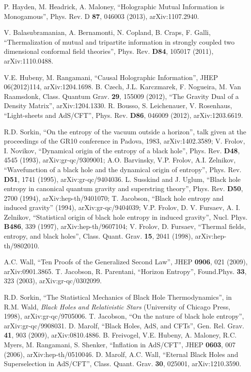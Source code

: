 \documentclass[12pt]{article}
\begin{document}
\begin{thebibliography}{99}
P. Hayden, M. Headrick, A. Maloney, ``Holographic Mutual Information is Monogamous'', Phys. Rev. D \textbf{87}, 046003 (2013), arXiv:1107.2940.

V. Balasubramanian, A. Bernamonti, N. Copland, B. Craps, F. Galli, ``Thermalization of mutual and tripartite information in strongly coupled two dimensional conformal field theories'', Phys. Rev. \textbf{D84}, 105017 (2011), arXiv:1110.0488.

V.E. Hubeny, M. Rangamani, ``Causal Holographic Information'', JHEP 06(2012)114, arXiv:1204.1698.
B. Czech, J.L. Karczmarek, F. Nogueira, M. Van Raamsdonk, Class. Quantum Grav. \textbf{29}, 155009 (2012), ``The Gravity Dual of a Density Matrix'', arXiv:1204.1330.
R. Bousso, S. Leichenauer, V. Rosenhaus, ``Light-sheets and AdS/CFT'', Phys. Rev. \textbf{D86}, 046009 (2012),  arXiv:1203.6619.

R.D. Sorkin, ``On the entropy of the vacuum outside a horizon'', talk given 
at the proceedings of the GR10 conference in Padova, 1983, arXiv:1402.3589;
V. Frolov, I. Novikov, ``Dynamical origin of the entropy of a black hole'', Phys. Rev. \textbf{D48}, 4545 (1993), 
arXiv:gr-qc/9309001; 
A.O. Barvinsky, V.P. Frolov, A.I. Zelnikov, ``Wavefunction of a black hole and the dynamical origin of entropy'', Phys. Rev. \textbf{D51}, 1741 (1995), arXiv:gr-qc/9404036.
L. Susskind and J. Uglum, ``Black hole entropy in canonical quantum gravity and superstring theory'', Phys. Rev. \textbf{D50}, 2700 (1994), arXiv:hep-th/9401070; 
T. Jacobson, ``Black hole entropy and induced gravity'' (1994), arXiv:gr-qc/9404039; 
V.P. Frolov, D. V. Fursaev, A. I. Zelnikov, ``Statistical origin of black hole entropy in induced gravity'', 
Nucl. Phys. \textbf{B486}, 339 (1997), arXiv:hep-th/9607104; 
V. Frolov, D. Fursaev, ``Thermal fields, entropy, and black holes'', Class. Quant. Grav. \textbf{15}, 2041 (1998), arXiv:hep-th/9802010.

A.C. Wall, ``Ten Proofs of the Generalized Second Law'', JHEP \textbf{0906}, 021 (2009), arXiv:0901.3865.
T. Jacobson, R. Parentani, ``Horizon Entropy'', Found.Phys. \textbf{33}, 323 (2003), arXiv:gr-qc/0302099.

R.D. Sorkin, ``The Statistical Mechanics of Black Hole Thermodynamics'', in R.M. Wald, \textit{Black Holes and Relativistic Stars} (University of Chicago Press, 1998), arXiv:gr-qc/9705006.
T. Jacobson, ``On the nature of black hole entropy'',  arXiv:gr-qc/9908031.
D. Marolf, ``Black Holes, AdS, and CFTs'', Gen. Rel. Grav. \textbf{41}, 903 (2009), arXiv:0810.4886.
B. Freivogel, V.E. Hubeny, A. Maloney, R.C. Myers, M. Rangamani, S. Shenker, ``Inflation in AdS/CFT'', JHEP \textbf{0603}, 007 (2006),  arXiv:hep-th/0510046.
D. Marolf, A.C. Wall, ``Eternal Black Holes and Superselection in AdS/CFT'', Class. Quant. Grav. \textbf{30}, 025001, arXiv:1210.3590.


\end{thebibliography}
\end{document}
